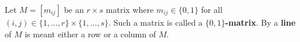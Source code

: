 Let $M = [m_{ij}]$ be an $r \times s$ matrix where $m_{ij} \in \{0, 1\}$ for all $(i, j) \in \{1, \ldots, r\} \times \{1, \ldots, s\}$. Such a matrix is called a \textbf{$\{0,1\}$-matrix}. By a \textbf{line} of $M$ is meant either a row or a column of $M$.
